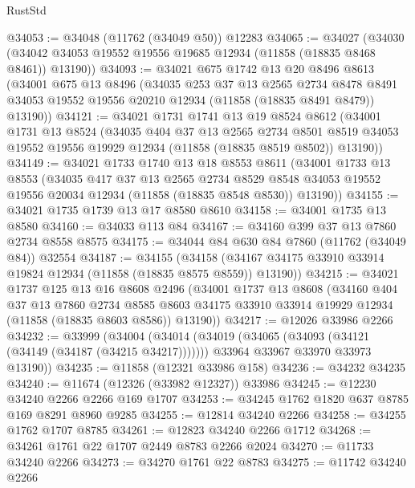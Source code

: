 \begin{lexlean}{RustStd}
\begin{coremodule}
@34053 := @34048 (@11762 (@34049 @50)) @12283
@34065 := @34027
    (@34030 (@34042 @34053 @19552 @19556 @19685 @12934 (@11858 (@18835 @8468 @8461)) @13190))
@34093 := @34021
    @675
    @1742
    @13
    @20
    @8496
    @8613
    (@34001
      @675
      @13
      @8496
      (@34035
        @253
        @37
        @13
        @2565
        @2734
        @8478
        @8491
        @34053
        @19552
        @19556
        @20210
        @12934
        (@11858 (@18835 @8491 @8479))
        @13190))
@34121 := @34021
    @1731
    @1741
    @13
    @19
    @8524
    @8612
    (@34001
      @1731
      @13
      @8524
      (@34035
        @404
        @37
        @13
        @2565
        @2734
        @8501
        @8519
        @34053
        @19552
        @19556
        @19929
        @12934
        (@11858 (@18835 @8519 @8502))
        @13190))
@34149 := @34021
    @1733
    @1740
    @13
    @18
    @8553
    @8611
    (@34001
      @1733
      @13
      @8553
      (@34035
        @417
        @37
        @13
        @2565
        @2734
        @8529
        @8548
        @34053
        @19552
        @19556
        @20034
        @12934
        (@11858 (@18835 @8548 @8530))
        @13190))
@34155 := @34021 @1735 @1739 @13 @17 @8580 @8610
@34158 := @34001 @1735 @13 @8580
@34160 := @34033 @113 @84
@34167 := @34160 @399 @37 @13 @7860 @2734 @8558 @8575
@34175 := @34044 @84 @630 @84 @7860 (@11762 (@34049 @84)) @32554
@34187 := @34155
    (@34158 (@34167 @34175 @33910 @33914 @19824 @12934 (@11858 (@18835 @8575 @8559)) @13190))
@34215 := @34021
    @1737
    @125
    @13
    @16
    @8608
    @2496
    (@34001
      @1737
      @13
      @8608
      (@34160
        @404
        @37
        @13
        @7860
        @2734
        @8585
        @8603
        @34175
        @33910
        @33914
        @19929
        @12934
        (@11858 (@18835 @8603 @8586))
        @13190))
@34217 := @12026 @33986 @2266
@34232 := @33999
    (@34004
      (@34014
        (@34019 (@34065 (@34093 (@34121 (@34149 (@34187 (@34215 @34217)))))))
        @33964
        @33967
        @33970
        @33973
        @13190))
@34235 := @11858 (@12321 @33986 @158)
@34236 := @34232 @34235
@34240 := @11674 (@12326 (@33982 @12327)) @33986
@34245 := @12230 @34240 @2266 @2266 @169 @1707
@34253 := @34245 @1762 @1820 @637 @8785 @169 @8291 @8960 @9285
@34255 := @12814 @34240 @2266
@34258 := @34255 @1762 @1707 @8785
@34261 := @12823 @34240 @2266 @1712
@34268 := @34261 @1761 @22 @1707 @2449 @8783 @2266 @2024
@34270 := @11733 @34240 @2266
@34273 := @34270 @1761 @22 @8783
@34275 := @11742 @34240 @2266

\end{coremodule}
\end{lexlean}
